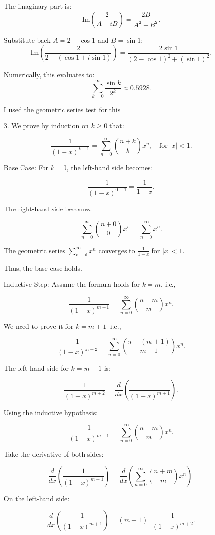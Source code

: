 \documentclass[12pt]{article}
\begin{document}
\begin{enumerate}
The imaginary part is:
\[
\text{Im}\left(\frac{2}{A + iB}\right) = \frac{2B}{A^2 + B^2}.
\]

Substitute back \(A = 2 - \cos 1\) and \(B = \sin 1\):
\[
\text{Im}\left(\frac{2}{2 - (\cos 1 + i \sin 1)}\right) = \frac{2 \sin 1}{(2 - \cos 1)^2 + (\sin 1)^2}.
\]

Numerically, this evaluates to:
\[
\sum_{k=0}^\infty \frac{\sin k}{2^k} \approx 0.5928.
\]

I used the geometric series test for this

\item [3. ]
We prove by induction on \( k \geq 0 \) that:

\[
\frac{1}{(1-x)^{k+1}} = \sum_{n=0}^\infty \binom{n+k}{k} x^n, \quad \text{for } |x| < 1.
\]

Base Case: For \( k = 0 \), the left-hand side becomes:

\[
\frac{1}{(1-x)^{0+1}} = \frac{1}{1-x}.
\]

The right-hand side becomes:

\[
\sum_{n=0}^\infty \binom{n+0}{0} x^n = \sum_{n=0}^\infty x^n.
\]

The geometric series \( \sum_{n=0}^\infty x^n \) converges to \( \frac{1}{1-x} \) for \( |x| < 1 \).

Thus, the base case holds.

Inductive Step: Assume the formula holds for \( k = m \), i.e.,

\[
\frac{1}{(1-x)^{m+1}} = \sum_{n=0}^\infty \binom{n+m}{m} x^n.
\]

We need to prove it for \( k = m+1 \), i.e.,

\[
\frac{1}{(1-x)^{m+2}} = \sum_{n=0}^\infty \binom{n+(m+1)}{m+1} x^n.
\]

The left-hand side for \( k = m+1 \) is:

\[
\frac{1}{(1-x)^{m+2}} = \frac{d}{dx} \left( \frac{1}{(1-x)^{m+1}} \right).
\]

Using the inductive hypothesis:

\[
\frac{1}{(1-x)^{m+1}} = \sum_{n=0}^\infty \binom{n+m}{m} x^n.
\]

Take the derivative of both sides:

\[
\frac{d}{dx} \left( \frac{1}{(1-x)^{m+1}} \right) = \frac{d}{dx} \left( \sum_{n=0}^\infty \binom{n+m}{m} x^n \right).
\]

On the left-hand side:

\[
\frac{d}{dx} \left( \frac{1}{(1-x)^{m+1}} \right) = (m+1) \cdot \frac{1}{(1-x)^{m+2}}.
\]


\end{enumerate}
\end{document}
